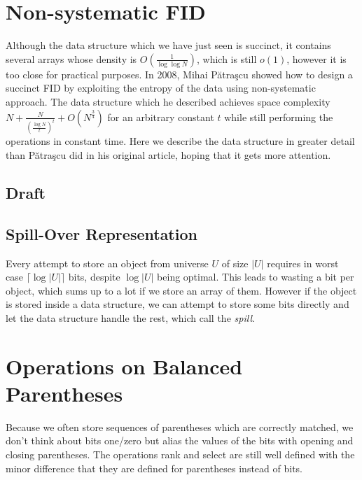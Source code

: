 \section{Non-systematic FID}
	
Although the data structure which we have just seen is succinct, it contains several arrays whose density is $O(\frac{1}{\log \log N})$, which is still $o(1)$, however it is too close for practical purposes.
In 2008, Mihai Pătraşcu showed how to design a succinct FID by exploiting the entropy of the data using non-systematic approach.
The data structure which he described achieves space complexity $N + \frac{N}{\left(\frac{\log N}{t}\right)^t} + O(N^\frac{3}{4})$ for an arbitrary constant $t$ while still performing the operations in constant time.
Here we describe the data structure in greater detail than Pătraşcu did in his original article, hoping that it gets more attention.

\subsection{Draft}

\subsection{Spill-Over Representation}

Every attempt to store an object from universe $U$ of size $|U|$ requires in worst case $\lceil \log |U| \rceil$ bits, despite $\log |U|$ being optimal.
This leads to wasting a bit per object, which sums up to a lot if we store an array of them.
However if the object is stored inside a data structure, we can attempt to store some bits directly and let the data structure handle the rest, which call the \emph{spill}.

\section{\label{s:op-bp}Operations on Balanced Parentheses}

Because we often store sequences of parentheses which are correctly matched, we don't think about bits one/zero but alias the values of the bits with opening and closing parentheses.
The operations rank and select are still well defined with the minor difference that they are defined for parentheses instead of bits.


